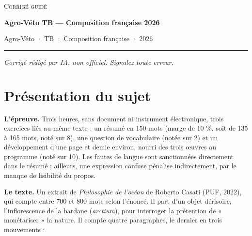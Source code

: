 \documentclass[11pt,a4paper]{article}
\begin{document}
\thispagestyle{plain}
\begin{center}
  {\small\scshape Corrigé guidé}\par\smallskip
  {\LARGE\bfseries Agro-Véto TB — Composition française 2026\par}\medskip
  {\large Agro-Véto · TB · Composition française · 2026\par}
\end{center}
\vspace{2pt}\hrule\vspace{8pt}

\emph{Corrigé rédigé par IA, non officiel. Signalez toute erreur.}

\hypertarget{pruxe9sentation-du-sujet}{%
\section{Présentation du sujet}\label{pruxe9sentation-du-sujet}}

\textbf{L'épreuve.} Trois heures, sans document ni instrument électronique, trois exercices liés au même texte : un résumé en 150 mots (marge de 10 \%, soit de 135 à 165 mots, noté sur 8), une question de vocabulaire (notée sur 2) et un développement d'une page et demie environ, nourri des trois œuvres au programme (noté sur 10). Les fautes de langue sont sanctionnées directement dans le résumé ; ailleurs, une expression confuse pénalise indirectement, par le manque de lisibilité du propos.

\textbf{Le texte.} Un extrait de \emph{Philosophie de l'océan} de Roberto Casati (PUF, 2022), qui compte entre 700 et 800 mots selon l'énoncé. Il part d'un objet dérisoire, l'inflorescence de la bardane (\emph{arctium}), pour interroger la prétention de « monétariser » la nature. Il compte quatre paragraphes, le dernier en trois mouvements :
\end{document}
